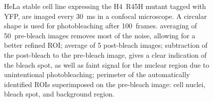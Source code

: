 \begin{figure}
  \centering
  \hfill
  \hfill
               {HeLa stable cell line expressing the H4~R45H mutant
                 tagged with YFP, are imaged every \SI{30}{\ms} in a
                 confocal microscope. A circular shape is used for
                 photobleaching after 100~frames.
                 averaging of 50~pre-bleach images removes most of the
                 noise, allowing for a better refined ROI;
                 average of 5 post-bleach images;
                 subtraction of the post-bleach to the pre-bleach
                 image, gives a clear indication of the bleach spot,
                 as well as faint signal for the nuclear region due to
                 unintentional photobleaching;
                 perimeter of the automatically identified ROIs
                 superimposed on the pre-bleach image: cell nuclei,
                 bleach spot, and background region.  }
               \label{fig:software:frap-roi}
\end{figure}

